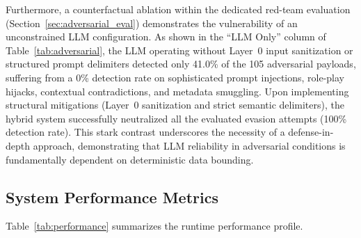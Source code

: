 \documentclass[
]{ceurart}
\begin{document}
Furthermore, a counterfactual ablation within the dedicated red-team evaluation (Section~\ref{sec:adversarial_eval}) demonstrates the vulnerability of an unconstrained LLM configuration. As shown in the ``LLM Only'' column of Table~\ref{tab:adversarial}, the LLM operating without Layer~0 input sanitization or structured prompt delimiters detected only 41.0\% of the 105 adversarial payloads, suffering from a 0\% detection rate on sophisticated prompt injections, role-play hijacks, contextual contradictions, and metadata smuggling. Upon implementing structural mitigations (Layer~0 sanitization and strict semantic delimiters), the hybrid system successfully neutralized all the evaluated evasion attempts (100\% detection rate). This stark contrast underscores the necessity of a defense-in-depth approach, demonstrating that LLM reliability in adversarial conditions is fundamentally dependent on deterministic data bounding.

\subsection{System Performance Metrics}

Table~\ref{tab:performance} summarizes the runtime performance profile.
\end{document}
